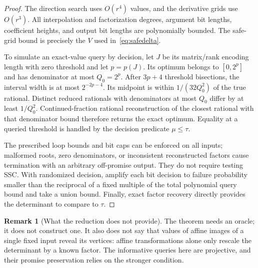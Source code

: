 \documentclass[11pt]{article}
\theoremstyle{definition}\newtheorem{definition}[theorem]{Definition}
\newtheorem{remark}[theorem]{Remark}
\begin{document}
\begin{proof}
The direction search uses $O(r^4)$ values, and the derivative grids use $O(r^3)$. All interpolation and factorization degrees, argument bit lengths, coefficient heights, and output bit lengths are polynomially bounded. The safe-grid bound is precisely the $V$ used in~\eqref{eq:safedelta}.

To simulate an exact-value query by decision, let $J$ be its matrix/rank encoding length with zero threshold and let $p=p(J)$. Its optimum belongs to $[0,2^p]$ and has denominator at most $Q_0=2^p$. After $3p+4$ threshold bisections, the interval width is at most $2^{-2p-4}$. Its midpoint is within $1/(32Q_0^2)$ of the true rational. Distinct reduced rationals with denominators at most $Q_0$ differ by at least $1/Q_0^2$. Continued-fraction rational reconstruction of the closest rational with that denominator bound therefore returns the exact optimum. Equality at a queried threshold is handled by the decision predicate $\mu\le\tau$.

The prescribed loop bounds and bit caps can be enforced on all inputs; malformed roots, zero denominators, or inconsistent reconstructed factors cause termination with an arbitrary off-promise output. They do not require testing SSC. With randomized decision, amplify each bit decision to failure probability smaller than the reciprocal of a fixed multiple of the total polynomial query bound and take a union bound. Finally, exact factor recovery directly provides the determinant to compare to $\tau$.
\end{proof}

\begin{remark}[What the reduction does not provide]
The theorem needs an oracle; it does not construct one. It also does not say that values of affine images of a single fixed input reveal its vertices: affine transformations alone only rescale the determinant by a known factor. The informative queries here are projective, and their promise preservation relies on the stronger condition.
\end{remark}
\end{document}
